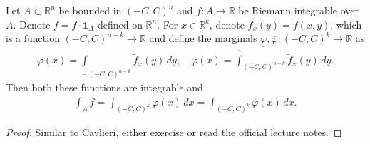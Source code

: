 \begin{theorem}[Fubini]\label{thm:fubini}
	Let $A \subset \mathbb{R}^{n}$ be bounded in $(-C, C)^{n}$ and $f: A \to \mathbb{R}$ be Riemann integrable over $A$. Denote $\tilde{f} = f \cdot \boldsymbol{1}_{A}$ defined on $\mathbb{R}^{n}$. For $x \in \mathbb{R}^{k}$, denote $\tilde{f}_{x}(y) = \tilde{f}(x,y)$, which is a function $(-C,C)^{n-k} \to \mathbb{R}$ and define the marginals $\underline{ \varphi }, \overline{ \varphi }: (-C,C)^{k} \to \mathbb{R}$ as
	\begin{align*}
		\underline{ \varphi }(x) = \underline{ \int }_{(-C, C)^{n-k}} \tilde{f}_{x}(y) \,dy, \quad
		\overline{ \varphi }(x) = \overline{ \int }_{(-C,C)^{n-k}} \tilde{f}_{x}(y) \, dy.
	\end{align*}
	Then both these functions are integrable and
	\begin{align*}
		\int_{A} f = \int_{(-C,C)^{k}} \underline{ \varphi }(x) \, dx = \int_{(-C,C)^{k}} \overline{ \varphi }(x)  \, dx.
	\end{align*}
\end{theorem}
\begin{proof}
	Similar to Cavlieri, either exercise or read the official lecture notes.
\end{proof}

